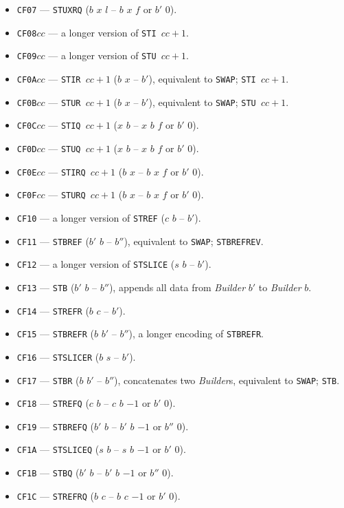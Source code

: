 \documentclass[12pt,oneside]{article}
\begin{document}
\begin{itemize}
\item {\tt CF07} --- {\tt STUXRQ} ($b$ $x$ $l$ -- $b$ $x$ $f$ or $b'$ $0$).
\item {\tt CF08$cc$} --- a longer version of {\tt STI $cc+1$}.
\item {\tt CF09$cc$} --- a longer version of {\tt STU $cc+1$}.
\item {\tt CF0A$cc$} --- {\tt STIR $cc+1$} ($b$ $x$ -- $b'$), equivalent to {\tt SWAP}; {\tt STI $cc+1$}.
\item {\tt CF0B$cc$} --- {\tt STUR $cc+1$} ($b$ $x$ -- $b'$), equivalent to {\tt SWAP}; {\tt STU $cc+1$}.
\item {\tt CF0C$cc$} --- {\tt STIQ $cc+1$} ($x$ $b$ -- $x$ $b$ $f$ or $b'$ $0$).
\item {\tt CF0D$cc$} --- {\tt STUQ $cc+1$} ($x$ $b$ -- $x$ $b$ $f$ or $b'$ $0$).
\item {\tt CF0E$cc$} --- {\tt STIRQ $cc+1$} ($b$ $x$ -- $b$ $x$ $f$ or $b'$ $0$).
\item {\tt CF0F$cc$} --- {\tt STURQ $cc+1$} ($b$ $x$ -- $b$ $x$ $f$ or $b'$ $0$).
\item {\tt CF10} --- a longer version of {\tt STREF} ($c$ $b$ -- $b'$).
\item {\tt CF11} --- {\tt STBREF} ($b'$ $b$ -- $b''$), equivalent to {\tt SWAP}; {\tt STBREFREV}.
\item {\tt CF12} --- a longer version of {\tt STSLICE} ($s$ $b$ -- $b'$).
\item {\tt CF13} --- {\tt STB} ($b'$ $b$ -- $b''$), appends all data from {\em Builder\/} $b'$ to {\em Builder\/} $b$.
\item {\tt CF14} --- {\tt STREFR} ($b$ $c$ -- $b'$).
\item {\tt CF15} --- {\tt STBREFR} ($b$ $b'$ -- $b''$), a longer encoding of {\tt STBREFR}.
\item {\tt CF16} --- {\tt STSLICER} ($b$ $s$ -- $b'$).
\item {\tt CF17} --- {\tt STBR} ($b$ $b'$ -- $b''$), concatenates two {\em Builder\/}s, equivalent to {\tt SWAP}; {\tt STB}.
\item {\tt CF18} --- {\tt STREFQ} ($c$ $b$ -- $c$ $b$ $-1$ or $b'$ $0$).
\item {\tt CF19} --- {\tt STBREFQ} ($b'$ $b$ -- $b'$ $b$ $-1$ or $b''$ $0$).
\item {\tt CF1A} --- {\tt STSLICEQ} ($s$ $b$ -- $s$ $b$ $-1$ or $b'$ $0$).
\item {\tt CF1B} --- {\tt STBQ} ($b'$ $b$ -- $b'$ $b$ $-1$ or $b''$ $0$).
\item {\tt CF1C} --- {\tt STREFRQ} ($b$ $c$ -- $b$ $c$ $-1$ or $b'$ $0$).

\end{itemize}
\end{document}
